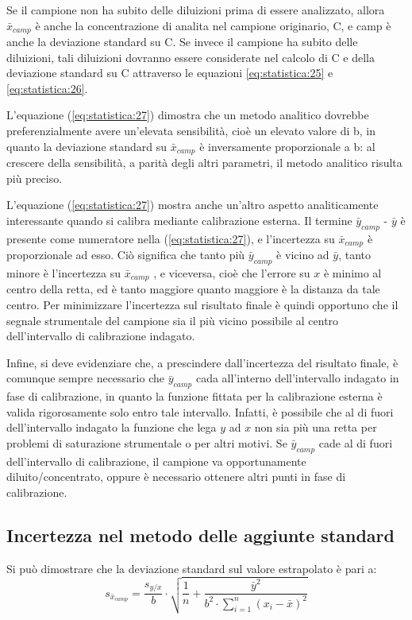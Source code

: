 Se il campione non ha subito delle diluizioni prima di essere analizzato, allora $\bar{x}_{camp}$ è anche la concentrazione di analita nel campione originario, C, e camp è anche la deviazione standard su C. Se invece il campione ha subito delle diluizioni, tali diluizioni dovranno essere considerate nel calcolo di C e della deviazione standard su C attraverso le equazioni \ref{eq:statistica:25} e \ref{eq:statistica:26}.

L'equazione (\ref{eq:statistica:27}) dimostra che un metodo analitico dovrebbe preferenzialmente avere un'elevata sensibilità, cioè un elevato valore di b, in quanto la deviazione standard su $\bar{x}_{camp}$ è inversamente proporzionale a b: al crescere della sensibilità, a parità degli altri parametri, il metodo analitico risulta più preciso.

L'equazione (\ref{eq:statistica:27}) mostra anche un'altro aspetto analiticamente interessante quando si calibra mediante calibrazione esterna. Il termine $\bar{y}_{camp}$ - $\bar{y}$ è presente come numeratore nella (\ref{eq:statistica:27}), e l'incertezza su $\bar{x}_{camp}$ è proporzionale ad esso. Ciò significa che tanto più $\bar{y}_{camp}$ è vicino ad $\bar{y}$, tanto minore è l'incertezza su $\bar{x}_{camp}$ , e viceversa, cioè che l'errore su $x$ è minimo al centro della retta, ed è tanto maggiore quanto maggiore è la distanza da tale centro. Per minimizzare l'incertezza sul risultato finale è quindi opportuno che il segnale strumentale del campione sia il più vicino possibile al centro dell'intervallo di calibrazione indagato.

Infine, si deve evidenziare che, a prescindere dall'incertezza del risultato finale, è comunque sempre necessario che $\bar{y}_{camp}$ cada all'interno dell'intervallo indagato in fase di calibrazione, in quanto la funzione fittata per la calibrazione esterna è valida rigorosamente solo entro tale intervallo. Infatti, è possibile che al di fuori dell'intervallo indagato la funzione che lega $y$ ad $x$ non sia più una retta per problemi di saturazione strumentale o per altri motivi. Se $\bar{y}_{camp}$ cade al di fuori dell'intervallo di calibrazione, il campione va opportunamente diluito/concentrato, oppure è necessario ottenere altri punti in fase di calibrazione.

\subsection{Incertezza nel metodo delle aggiunte standard}
Si può dimostrare che la deviazione standard sul valore estrapolato è pari a:
\begin{equation} \label{eq:statistica:28}
s_{\bar{x}_{camp}} = \frac{s_{y/x}}{b} \cdot \sqrt{\frac{1}{n} + \frac{\bar{y}^2}{b^2 \cdot \sum_{i=1}^n (x_i - \bar{x})^2}}
\end{equation}

